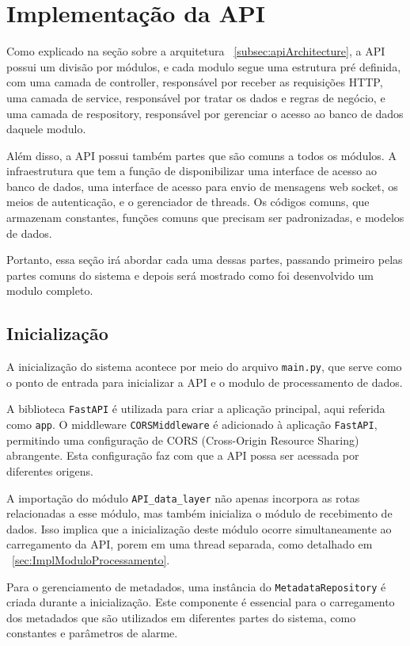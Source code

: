 \section[Implementação da API]{Implementação da API}\label{sec:api}
Como explicado na seção sobre a arquitetura ~\ref{subsec:apiArchitecture}, a \gls{API} possui um divisão por módulos, e cada modulo segue uma estrutura pré definida, com uma camada de controller, responsável por receber as requisições \gls{HTTP}, uma camada de service, responsável por tratar os dados e regras de negócio, e uma camada de respository, responsável por gerenciar o acesso ao banco de dados daquele modulo. 

Além disso, a \gls{API} possui também partes que são comuns a todos os módulos. A infraestrutura que tem a função de disponibilizar uma interface de acesso ao banco de dados, uma interface de acesso para envio de mensagens web socket, os meios de autenticação, e o gerenciador de threads. Os códigos comuns, que armazenam constantes, funções comuns que precisam ser padronizadas, e modelos de dados.

Portanto, essa seção irá abordar cada uma dessas partes, passando primeiro pelas partes comuns do sistema e depois será mostrado como foi desenvolvido um modulo completo.

\subsection{Inicialização}\label{subsec:main}
A inicialização do sistema acontece por meio do arquivo \texttt{main.py}, que serve como o ponto de entrada para inicializar a \gls{API} e o modulo de processamento de dados.

A biblioteca \texttt{FastAPI} \cite{fastapiDocs} é utilizada para criar a aplicação principal, aqui referida como \texttt{app}. O middleware \texttt{CORSMiddleware} é adicionado à aplicação \texttt{FastAPI}, permitindo uma configuração de \gls{CORS} (Cross-Origin Resource Sharing) abrangente. Esta configuração faz com que a \gls{API} possa ser acessada por diferentes origens.

A importação do módulo \texttt{API\_data\_layer} não apenas incorpora as rotas relacionadas a esse módulo, mas também inicializa o módulo de recebimento de dados. Isso implica que a inicialização deste módulo ocorre simultaneamente ao carregamento da \gls{API}, porem em uma thread separada, como detalhado em ~\ref{sec:ImplModuloProcessamento}.

Para o gerenciamento de metadados, uma instância do \texttt{MetadataRepository} é criada durante a inicialização. Este componente é essencial para o carregamento dos metadados que são utilizados em diferentes partes do sistema, como constantes e parâmetros de alarme.

